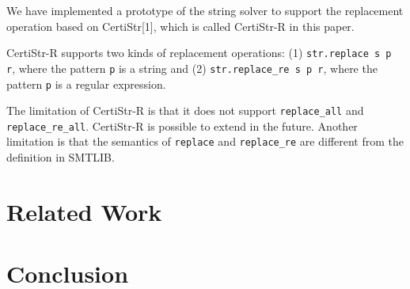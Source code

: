 \documentclass[a4paper,UKenglish,cleveref, autoref, thm-restate]{lipics-v2021}
\begin{document}
We have implemented a prototype of the string solver to support the replacement operation based on CertiStr[1], which is called CertiStr-R in this paper.

CertiStr-R supports two kinds of replacement operations: (1) \texttt{str.replace s p r}, where the pattern \texttt{p} is a string and (2) \texttt{str.replace\_re s p r}, where the pattern \texttt{p} is a regular expression. 


The limitation of CertiStr-R is that it does not support \texttt{replace\_all} and \texttt{replace\_re\_all}. CertiStr-R is possible to extend in the future. Another limitation is that the semantics of \texttt{replace} and \texttt{replace\_re} are different from the definition in SMTLIB.

\section{Related Work}

\section{Conclusion}



\end{document}
